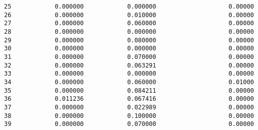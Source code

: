 \documentclass[11pt]{article}
\begin{document}
\begin{tcolorbox}[breakable, size=fbox, boxrule=.5pt, pad at break*=1mm, opacityfill=0]
\begin{Verbatim}[commandchars=\\\{\}]
25            0.000000            0.000000                    0.00000
26            0.000000            0.010000                    0.00000
27            0.000000            0.060000                    0.00000
28            0.000000            0.000000                    0.00000
29            0.000000            0.080000                    0.00000
30            0.000000            0.000000                    0.00000
31            0.000000            0.070000                    0.00000
32            0.000000            0.063291                    0.00000
33            0.000000            0.000000                    0.00000
34            0.000000            0.060000                    0.01000
35            0.000000            0.084211                    0.00000
36            0.011236            0.067416                    0.00000
37            0.000000            0.022989                    0.00000
38            0.000000            0.100000                    0.00000
39            0.000000            0.070000                    0.00000


\end{Verbatim}
\end{tcolorbox}
\end{document}
